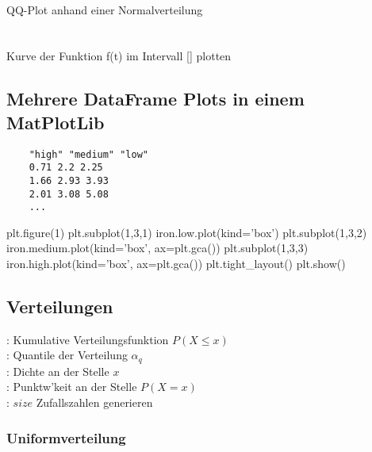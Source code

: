 \documentclass{article}
\begin{document}
\begin{multicols*}{3}
 \\
QQ-Plot anhand einer Normalverteilung\\

\\
\\
Kurve der Funktion f(t) im Intervall [] plotten

\vfill\null
\columnbreak

\subsection*{Mehrere DataFrame Plots in einem MatPlotLib}

\begin{tcolorbox}[boxrule=1pt,colback=black!4!white, title=\underline{\textbf{Struktur der Daten f�r die n�chsten Befehle}},colframe=black!4!white,coltitle=black]
	\begin{verbatim}
	"high" "medium" "low"
	0.71 2.2 2.25
	1.66 2.93 3.93
	2.01 3.08 5.08
	...
	\end{verbatim}
\end{tcolorbox}

\begin{python}
plt.figure(1)
plt.subplot(1,3,1)
iron.low.plot(kind='box')
plt.subplot(1,3,2)
iron.medium.plot(kind='box', ax=plt.gca())
plt.subplot(1,3,3)
iron.high.plot(kind='box', ax=plt.gca())
plt.tight_layout()
plt.show()
\end{python}

\subsection*{Verteilungen}
: Kumulative Verteilungsfunktion $P(X \leq x)$ \\
: Quantile der Verteilung $\alpha_q$ \\
: Dichte an der Stelle $x$ \\
: Punktw'keit an der Stelle $P(X=x)$ \\
: $size$ Zufallszahlen generieren

\subsubsection*{Uniformverteilung}


\end{multicols*}
\end{document}
